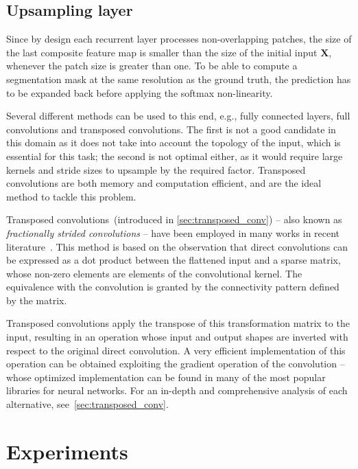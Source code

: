 \subsection{Upsampling layer}\label{sec:upsampling}

Since by design each recurrent layer processes non-overlapping patches, the
size of the last composite feature map is smaller than the size of the
initial input $\mathbf{X}$, whenever the patch size is greater than one. To be
able to compute a segmentation mask at the same resolution as the ground truth,
the prediction has to be expanded back before applying the softmax
non-linearity.

Several different methods can be used to this end, e.g., fully connected
layers, full convolutions and transposed convolutions. The first is not a good
candidate in this domain as it does not take into account the topology of the
input, which is essential for this task; the second is not optimal either, as
it would require large kernels and stride sizes to upsample by the required
factor. Transposed convolutions are both memory and computation efficient, and
are the ideal method to tackle this problem.

Transposed convolutions~(introduced in \autoref{sec:transposed_conv}) -- also
known as \emph{fractionally strided convolutions} -- have been employed in many
works in recent literature~\citep{Zeiler-ICCV2011,ZeilerFergus14,long2015fully,
radford2015unsupervised,im2016generating}. This method is based on the
observation that direct convolutions can be expressed as a dot product between
the flattened input and a sparse matrix, whose non-zero elements are elements
of the convolutional kernel. The equivalence with the convolution is granted by
the connectivity pattern defined by the matrix.

Transposed convolutions apply the transpose of this transformation matrix to
the input, resulting in an operation whose input and output shapes are inverted
with respect to the original direct convolution. A very efficient
implementation of this operation can be obtained exploiting the gradient
operation of the convolution -- whose optimized implementation can be found in
many of the most popular libraries for neural networks. For an in-depth and
comprehensive analysis of each alternative,
see~\autoref{sec:transposed_conv}.


\section{Experiments}\label{sec:reseg_experiments}

